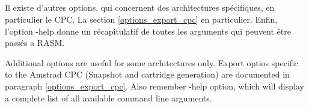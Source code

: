 



\subsection{}

\begin{xfr}
  Il existe d'autres options, qui concernent des architectures spécifiques, en particulier le CPC. La section \ref{options_export_cpc} en particulier.
  Enfin, l'option -help donne un récapitulatif de toutes les arguments qui peuvent être passés a RASM.
\end{xfr}

\begin{xen}
  Additional options are useful for some architectures only. Export optios specific to the Amstrad CPC (Snapshot and cartridge generation) are documented in paragraph \ref{options_export_cpc}.
  Also remember -help option, which will display a complete list of all available command line arguments.
\end{xen}
